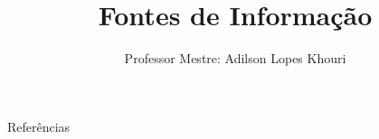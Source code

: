 \documentclass[compress, hyperref={pdfpagelayout=SinglePage}]{beamer}
\title[TCC II - Aula 03]{Fontes de Informação}
\author{Professor Mestre: Adilson Lopes Khouri}
\begin{document}
	
	\begin{frame}
		\titlepage
	\end{frame}
	
	
	
	
	
	
	
	
	
	
	
	\begin{frame}[allowframebreaks]{Referências}
			\tiny
			\nocite{*}
			
	    		
	\end{frame}
	
\end{document}

